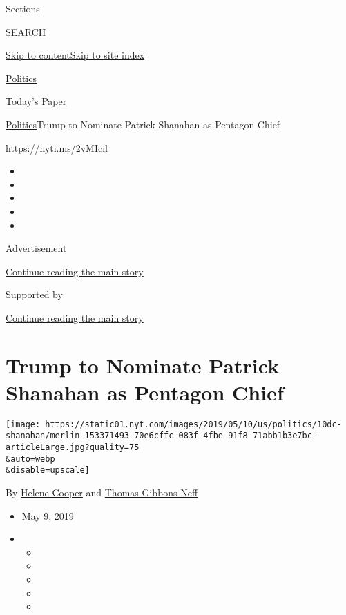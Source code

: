 Sections

SEARCH

\protect\hyperlink{site-content}{Skip to
content}\protect\hyperlink{site-index}{Skip to site index}

\href{https://www.nytimes.com/section/politics}{Politics}

\href{https://myaccount.nytimes.com/auth/login?response_type=cookie\&client_id=vi}{}

\href{https://www.nytimes.com/section/todayspaper}{Today's Paper}

\href{/section/politics}{Politics}\textbar{}Trump to Nominate Patrick
Shanahan as Pentagon Chief

\url{https://nyti.ms/2vMIcil}

\begin{itemize}
\item
\item
\item
\item
\item
\end{itemize}

Advertisement

\protect\hyperlink{after-top}{Continue reading the main story}

Supported by

\protect\hyperlink{after-sponsor}{Continue reading the main story}

\hypertarget{trump-to-nominate-patrick-shanahan-as-pentagon-chief}{%
\section{Trump to Nominate Patrick Shanahan as Pentagon
Chief}\label{trump-to-nominate-patrick-shanahan-as-pentagon-chief}}

\texttt{[image: https://static01.nyt.com/images/2019/05/10/us/politics/10dc-shanahan/merlin\_153371493\_70e6cffc-083f-4fbe-91f8-71abb1b3e7bc-articleLarge.jpg?quality=75\\\&auto=webp\\\&disable=upscale]}

By \href{https://www.nytimes.com/by/helene-cooper}{Helene Cooper} and
\href{https://www.nytimes.com/by/thomas-gibbons-neff}{Thomas
Gibbons-Neff}

\begin{itemize}
\item
  May 9, 2019
\item
  \begin{itemize}
  \item
  \item
  \item
  \item
  \item
  \end{itemize}
\end{itemize}

